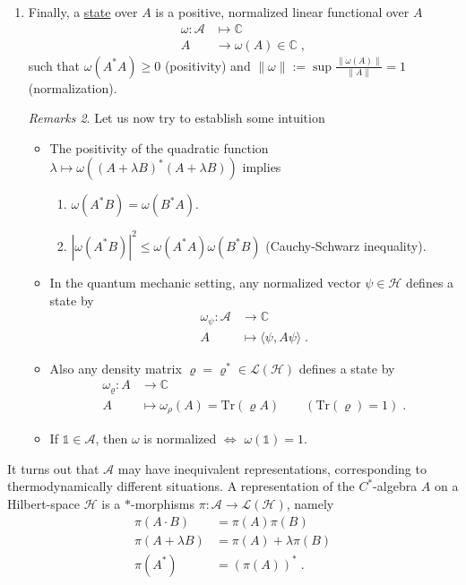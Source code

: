 \documentclass[
a4paper, %
11pt, %
onecolumn, %
openany, %
]{memoir}
\theoremstyle{definition}
\theoremstyle{remark}
\newtheorem{remarks}{Remarks}[chapter]
\theoremstyle{plain}
\begin{document}
\begin{enumerate}
\begin{remarks}
\end{remarks}
\item Finally, a \underline{state} over $A$ is a positive, normalized linear functional over $A$ \begin{align*}
\omega:\mathcal{A}&\longmapsto \mathbb{C}\\
A&\longrightarrow \omega(A)\in\mathbb{C}\; ,
\end{align*}
such that $\omega(A^*A)\geq 0$ (positivity) and $\|\omega \| :=\sup \frac{\|\omega(A)\|}{\|A\|}=1$ (normalization).
\begin{remarks}
	Let us now try to establish some intuition \begin{itemize}
		\item The positivity of the quadratic function $\lambda\mapsto \omega((A+\lambda B)^*(A+\lambda B))$ implies 
		\begin{enumerate}
			\item $\omega(A^*B)=\omega(B^*A)$.
			\item $|\omega(A^*B)|^2\leq \omega(A^*A)\omega(B^*B)$ (Cauchy-Schwarz inequality).
		\end{enumerate}
		\item In the quantum mechanic setting, any normalized vector $\psi\in\mathcal{H}$ defines a state by \begin{align}\omega_{\psi}:\mathcal{A}&\longrightarrow \mathbb{C}\\
		A&\longmapsto \langle \psi, A\psi\rangle \; .\end{align}
		\item Also any density matrix $\varrho = \varrho^*\in \mathcal{L}(\mathcal{H})$ defines a state by \begin{align}
		\omega_{\varrho}:A&\longrightarrow \mathbb{C}\\
		A&\longmapsto \omega_{\rho}(A)=\mathrm{Tr}(\varrho A) \qquad (\mathrm{Tr}(\varrho)=1) \; .
		\end{align}
		\item If $\mathds{1}\in\mathcal{A}$, then $\omega$ is normalized $\Leftrightarrow$ $\omega(\mathds{1})=1$.
		\end{itemize}
\end{remarks}
\end{enumerate}
It turns out that $\mathcal{A}$ may have inequivalent representations, corresponding to thermodynamically different situations. A representation of the $C^*$-algebra $A$ on a Hilbert-space $\mathcal{H}$ is a $*$-morphisms
$\pi:\mathcal{A}\longrightarrow \mathcal{L}(\mathcal{H})$, namely \begin{align}
\pi(A\cdot B)&=\pi(A)\pi(B) \\
\pi(A+\lambda B)&=\pi(A)+\lambda\pi(B)\\
\pi(A^*)&=(\pi(A))^*\;.
\end{align}
\end{document}
